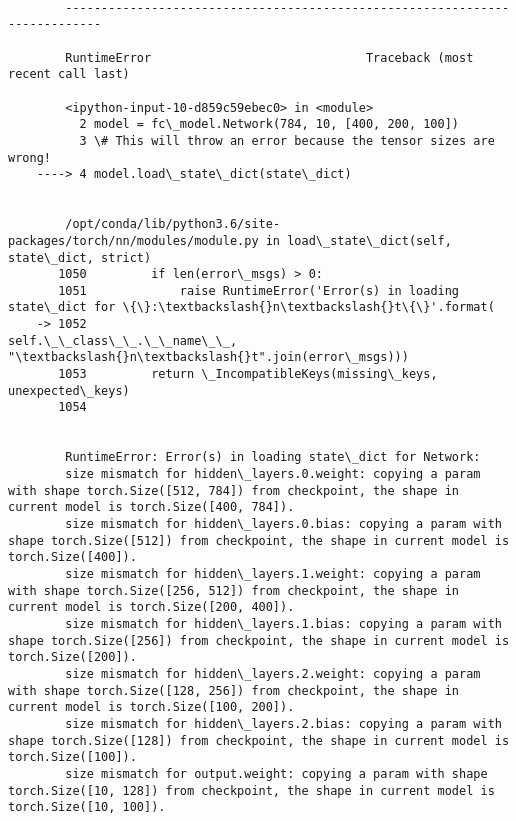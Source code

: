 \documentclass[11pt]{article}
\begin{document}
    \begin{Verbatim}[commandchars=\\\{\}]

        ---------------------------------------------------------------------------

        RuntimeError                              Traceback (most recent call last)

        <ipython-input-10-d859c59ebec0> in <module>
          2 model = fc\_model.Network(784, 10, [400, 200, 100])
          3 \# This will throw an error because the tensor sizes are wrong!
    ----> 4 model.load\_state\_dict(state\_dict)
    

        /opt/conda/lib/python3.6/site-packages/torch/nn/modules/module.py in load\_state\_dict(self, state\_dict, strict)
       1050         if len(error\_msgs) > 0:
       1051             raise RuntimeError('Error(s) in loading state\_dict for \{\}:\textbackslash{}n\textbackslash{}t\{\}'.format(
    -> 1052                                self.\_\_class\_\_.\_\_name\_\_, "\textbackslash{}n\textbackslash{}t".join(error\_msgs)))
       1053         return \_IncompatibleKeys(missing\_keys, unexpected\_keys)
       1054 


        RuntimeError: Error(s) in loading state\_dict for Network:
    	size mismatch for hidden\_layers.0.weight: copying a param with shape torch.Size([512, 784]) from checkpoint, the shape in current model is torch.Size([400, 784]).
    	size mismatch for hidden\_layers.0.bias: copying a param with shape torch.Size([512]) from checkpoint, the shape in current model is torch.Size([400]).
    	size mismatch for hidden\_layers.1.weight: copying a param with shape torch.Size([256, 512]) from checkpoint, the shape in current model is torch.Size([200, 400]).
    	size mismatch for hidden\_layers.1.bias: copying a param with shape torch.Size([256]) from checkpoint, the shape in current model is torch.Size([200]).
    	size mismatch for hidden\_layers.2.weight: copying a param with shape torch.Size([128, 256]) from checkpoint, the shape in current model is torch.Size([100, 200]).
    	size mismatch for hidden\_layers.2.bias: copying a param with shape torch.Size([128]) from checkpoint, the shape in current model is torch.Size([100]).
    	size mismatch for output.weight: copying a param with shape torch.Size([10, 128]) from checkpoint, the shape in current model is torch.Size([10, 100]).

    \end{Verbatim}
\end{document}
